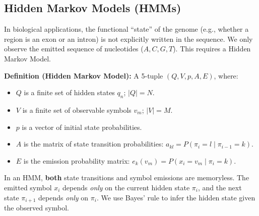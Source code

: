 \subsection{Hidden Markov Models (HMMs)}

In biological applications, the functional ``state'' of the genome (e.g., whether a region is an exon or an intron) is not explicitly written in the sequence. We only observe the emitted sequence of nucleotides (\(A, C, G, T\)). This requires a Hidden Markov Model.

\begin{important}
  \textbf{Definition (Hidden Markov Model):} A 5-tuple \( (Q, V, p, A, E) \), where:
  \begin{itemize}
      \item \( Q \) is a finite set of hidden states \( q_n \); \( |Q| = N \).
      \item \( V \) is a finite set of observable symbols \( v_m \); \( |V| = M \).
      \item \( p \) is a vector of initial state probabilities.
      \item \( A \) is the matrix of state transition probabilities: \( a_{kl} = P(\pi_i = l \mid \pi_{i-1} = k) \).
      \item \( E \) is the emission probability matrix: \( e_k(v_m) = P(x_i = v_m \mid \pi_i = k) \).
  \end{itemize}
\end{important}

\sta In an HMM, \textbf{both} state transitions and symbol emissions are memoryless. The emitted symbol \( x_i \) depends \textit{only} on the current hidden state \( \pi_i \), and the next state \( \pi_{i+1} \) depends \textit{only} on \( \pi_i \). We use Bayes' rule to infer the hidden state given the observed symbol.


